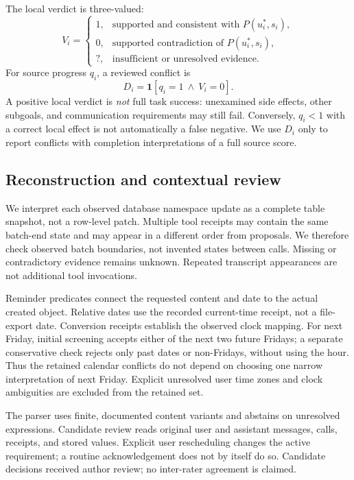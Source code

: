 \documentclass[10pt,letterpaper]{article}
\begin{document}
The local verdict is three-valued:
\begin{equation}
V_i=\begin{cases}
1,&\text{supported and consistent with }P(u_i^*,s_i),\\
0,&\text{supported contradiction of }P(u_i^*,s_i),\\
?,&\text{insufficient or unresolved evidence}.
\end{cases}
\label{eq:verdict}
\end{equation}
For source progress $q_i$, a reviewed conflict is
\begin{equation}
D_i=\mathbf{1}[q_i=1\ \land\ V_i=0].
\label{eq:conflict}
\end{equation}
A positive local verdict is \emph{not} full task success: unexamined side effects, other subgoals, and communication requirements may still fail. Conversely, $q_i<1$ with a correct local effect is not automatically a false negative. We use $D_i$ only to report conflicts with completion interpretations of a full source score.

\subsection{Reconstruction and contextual review}
We interpret each observed database namespace update as a complete table snapshot, not a row-level patch. Multiple tool receipts may contain the same batch-end state and may appear in a different order from proposals. We therefore check observed batch boundaries, not invented states between calls. Missing or contradictory evidence remains unknown. Repeated transcript appearances are not additional tool invocations.

Reminder predicates connect the requested content and date to the actual created object. Relative dates use the recorded current-time receipt, not a file-export date. Conversion receipts establish the observed clock mapping. For next Friday, initial screening accepts either of the next two future Fridays; a separate conservative check rejects only past dates or non-Fridays, without using the hour. Thus the retained calendar conflicts do not depend on choosing one narrow interpretation of next Friday. Explicit unresolved user time zones and clock ambiguities are excluded from the retained set.

The parser uses finite, documented content variants and abstains on unresolved expressions. Candidate review reads original user and assistant messages, calls, receipts, and stored values. Explicit user rescheduling changes the active requirement; a routine acknowledgement does not by itself do so. Candidate decisions received author review; no inter-rater agreement is claimed.
\end{document}
